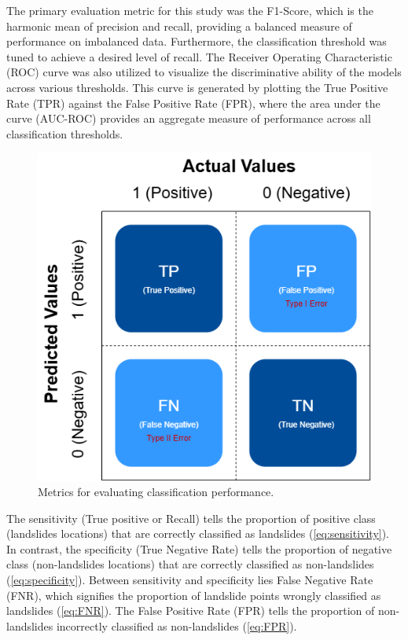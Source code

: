 The primary evaluation metric for this study was the F1-Score, which is the harmonic mean of precision and recall, providing a balanced measure of performance on imbalanced data. Furthermore, the classification threshold was tuned to achieve a desired level of recall. The Receiver Operating Characteristic (ROC) curve was also utilized to visualize the discriminative ability of the models across various thresholds. This curve is generated by plotting the True Positive Rate (TPR) against the False Positive Rate (FPR), where the area under the curve (AUC-ROC) provides an aggregate measure of performance across all classification thresholds.
\begin{figure}[H]
    \centerline{\includegraphics[width=\linewidth]{fig5.png}}
    \caption{Metrics for evaluating classification performance.}
    \label{fig}
\end{figure}

The sensitivity (True positive or Recall) tells the proportion of positive class (landslides locations) that are correctly classified as landslides (\ref{eq:sensitivity}). In contrast, the specificity (True Negative Rate) tells the proportion of negative class (non-landslides locations) that are correctly classified as non-landslides (\ref{eq:specificity}). Between sensitivity and specificity lies False Negative Rate (FNR), which signifies the proportion of landslide points wrongly classified as landslides (\ref{eq:FNR}). The False Positive Rate (FPR) tells the proportion of non-landslides incorrectly classified as non-landslides (\ref{eq:FPR}).


